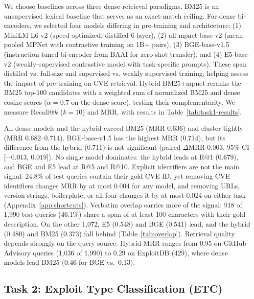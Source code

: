\documentclass{article}
\begin{document}
We choose baselines across three dense retrieval paradigms. BM25 is an unsupervised lexical baseline that serves as an exact-match ceiling. For dense bi-encoders, we selected four models differing in pre-training and architecture: (1) MiniLM-L6-v2 (speed-optimized, distilled 6-layer), (2) all-mpnet-base-v2 (mean-pooled MPNet with contrastive training on 1B+ pairs), (3) BGE-base-v1.5 (instruction-tuned bi-encoder from BAAI for zero-shot transfer), and (4) E5-base-v2 (weakly-supervised contrastive model with task-specific prompts). These span distilled vs. full-size and supervised vs. weakly supervised training, helping assess the impact of pre-training on CVE retrieval. Hybrid BM25+mpnet reranks the BM25 top-100 candidates with a weighted sum of normalized BM25 and dense cosine scores ($\alpha{=}0.7$ on the dense score), testing their complementarity. We measure Recall@$k$ ($ k= {10}$) and MRR, with results in Table~\ref{tab:task1-results}.

All dense models and the hybrid exceed BM25 (MRR 0.636) and cluster tightly (MRR 0.682--0.714). BGE-base-v1.5 has the highest MRR (0.714), but its difference from the hybrid (0.711) is not significant (paired $\Delta$MRR 0.003, 95\% CI [$-$0.013, 0.019]). No single model dominates: the hybrid leads at R@1 (0.679), and BGE and E5 lead at R@5 and R@10. Explicit identifiers are not the main signal: 24.8\% of test queries contain their gold CVE ID, yet removing CVE identifiers changes MRR by at most 0.004 for any model, and removing URLs, version strings, boilerplate, or all four changes it by at most 0.024 on either task (Appendix~\ref{app:shortcuts}). Verbatim overlap carries more of the signal: 918 of 1,990 test queries (46.1\%) share a span of at least 100 characters with their gold description. On the other 1,072, E5 (0.548) and BGE (0.541) lead, and the hybrid (0.480) and BM25 (0.373) fall behind (Table~\ref{tab:overlap}). Retrieval quality depends strongly on the query source. Hybrid MRR ranges from 0.95 on GitHub Advisory queries (1,036 of 1,990) to 0.29 on ExploitDB (429), where dense models lead BM25 (0.46 for BGE vs.\ 0.13).

\subsection{Task 2: Exploit Type Classification (ETC)}
\label{sec:task2}
\end{document}
